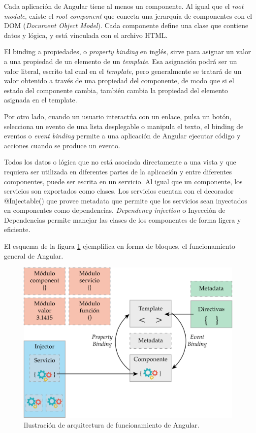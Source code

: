 Cada aplicación de Angular tiene al menos un componente. Al igual que el \textit{root module}, existe el \textit{root component} que conecta una jerarquía de componentes con el DOM (\textit{Document Object Model})\citep{WEBSITE:31}.  Cada componente define una clase que contiene datos y lógica, y está vinculada con el archivo HTML.

El binding a propiedades, o \textit{property binding} en inglés, sirve para asignar un valor a una propiedad de un elemento de un \textit{template}. Esa asignación podrá ser un valor literal, escrito tal cual en el \textit{template}, pero generalmente se tratará de un valor obtenido a través de una propiedad del componente, de modo que si el estado del componente cambia, también cambia la propiedad del elemento asignada en el template.

Por otro lado, cuando un usuario interactúa con un enlace, pulsa un botón, selecciona un evento de una lista desplegable o manipula el texto, el binding de eventos o \textit{event binding} permite a una aplicación de Angular ejecutar código y acciones cuando se produce un evento.

Todos los datos o lógica que no está asociada directamente a una vista y que requiera ser utilizada en diferentes partes de la aplicación y entre diferentes componentes, puede ser escrita en un servicio. Al igual que un componente, los servicios son exportados como clases. Los servicios cuentan con el decorador @Injectable() que provee metadata que permite que los servicios sean inyectados en componentes como dependencias.  \textit{Dependency injection} o Inyección de Dependencias permite manejar las clases de los componentes de forma ligera y eficiente. 

El esquema de la figura \ref{fig:esquema-angular} ejemplifica en forma de bloques, el funcionamiento general de Angular.

\begin{figure}[htpb]
	\centering
	\includegraphics[scale=.7]{./Figures/angular-esquema.png}
	\caption[Arquitectura de funcionamiento de Angular ]{Ilustración de arquitectura de funcionamiento de Angular\protect\footnotemark.}
	\label{fig:esquema-angular}
\end{figure}


